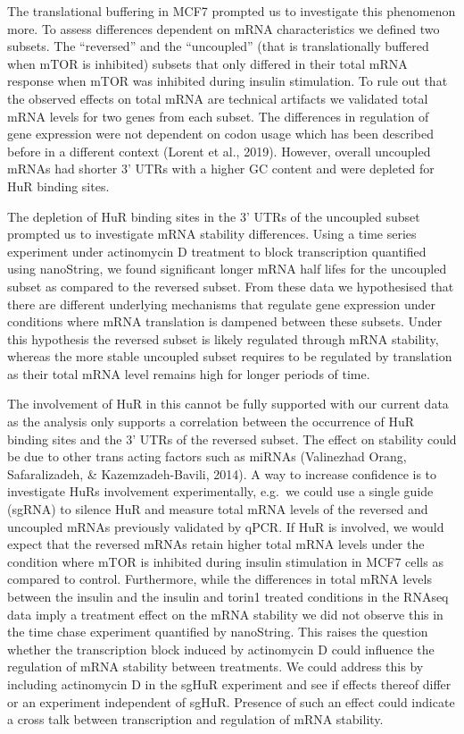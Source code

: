 \documentclass[
  12pt,
  openany]{book}
\begin{document}
The translational buffering in MCF7 prompted us to investigate this phenomenon more. To assess differences dependent on mRNA characteristics we defined two subsets. The ``reversed'' and the ``uncoupled'' (that is translationally buffered when mTOR is inhibited) subsets that only differed in their total mRNA response when mTOR was inhibited during insulin stimulation. To rule out that the observed effects on total mRNA are technical artifacts we validated total mRNA levels for two genes from each subset. The differences in regulation of gene expression were not dependent on codon usage which has been described before in a different context (Lorent et al., 2019). However, overall uncoupled mRNAs had shorter 3' UTRs with a higher GC content and were depleted for HuR binding sites.

The depletion of HuR binding sites in the 3' UTRs of the uncoupled subset prompted us to investigate mRNA stability differences. Using a time series experiment under actinomycin D treatment to block transcription quantified using nanoString, we found significant longer mRNA half lifes for the uncoupled subset as compared to the reversed subset. From these data we hypothesised that there are different underlying mechanisms that regulate gene expression under conditions where mRNA translation is dampened between these subsets. Under this hypothesis the reversed subset is likely regulated through mRNA stability, whereas the more stable uncoupled subset requires to be regulated by translation as their total mRNA level remains high for longer periods of time.

The involvement of HuR in this cannot be fully supported with our current data as the analysis only supports a correlation between the occurrence of HuR binding sites and the 3' UTRs of the reversed subset. The effect on stability could be due to other trans acting factors such as miRNAs (Valinezhad Orang, Safaralizadeh, \& Kazemzadeh-Bavili, 2014). A way to increase confidence is to investigate HuRs involvement experimentally, e.g.~we could use a single guide (sgRNA) to silence HuR and measure total mRNA levels of the reversed and uncoupled mRNAs previously validated by qPCR. If HuR is involved, we would expect that the reversed mRNAs retain higher total mRNA levels under the condition where mTOR is inhibited during insulin stimulation in MCF7 cells as compared to control. Furthermore, while the differences in total mRNA levels between the insulin and the insulin and torin1 treated conditions in the RNAseq data imply a treatment effect on the mRNA stability we did not observe this in the time chase experiment quantified by nanoString. This raises the question whether the transcription block induced by actinomycin D could influence the regulation of mRNA stability between treatments. We could address this by including actinomycin D in the sgHuR experiment and see if effects thereof differ or an experiment independent of sgHuR. Presence of such an effect could indicate a cross talk between transcription and regulation of mRNA stability.
\end{document}
